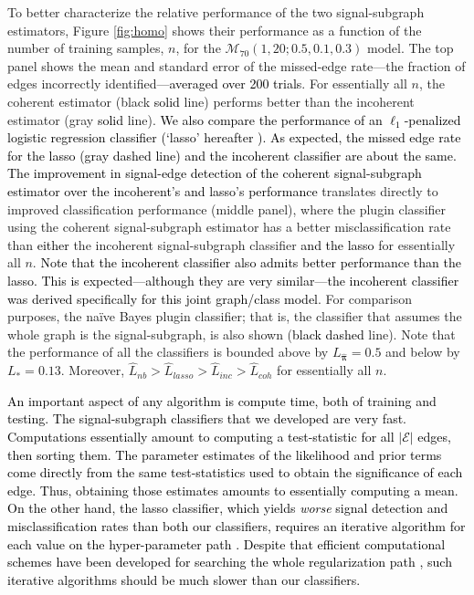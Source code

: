 \documentclass[10pt,journal,cspaper,compsoc]{IEEEtran}
\providecommand{\tk}[1]{\textcolor{black}{#1}}
\providecommand{\mc}[1]{\mathcal{#1}}
\providecommand{\wh}[1]{\widehat{#1}}
\providecommand{\mhb}[1]{\hat{\boldsymbol{#1}}}
\newcommand{\comment}[1]{}
\begin{document}
To better characterize the relative performance of the two signal-subgraph estimators, Figure \ref{fig:homo} shows their performance as a function of the number of training samples, $n$, for the $\mc{M}_{70}(1,20;0.5,0.1,0.3)$ model.  The top panel shows the mean and standard error of the missed-edge rate---the fraction of edges incorrectly identified\tk{---averaged over 200 trials}.  For essentially all $n$, the coherent estimator (black \tk{solid} line) performs better than the incoherent estimator (gray \tk{solid} line).  \tk{We also compare the performance of an $\ell_1$-penalized logistic regression classifier  (`lasso' hereafter \cite{Tibs96}).  As expected, the missed edge rate for the lasso (gray dashed line) and the incoherent classifier are about the same. The improvement in signal-edge detection of the coherent signal-subgraph estimator over the incoherent's and lasso's performance} \comment{This} translates directly to improved classification performance (middle panel), where the plugin classifier using the coherent signal-subgraph estimator has a better misclassification rate than \tk{either} the incoherent signal-subgraph classifier \tk{and the lasso} for essentially all $n$. \tk{Note that the incoherent classifier also admits better performance than the lasso.  This is expected---although they are very similar---the incoherent classifier was derived specifically for this joint graph/class model}.  For comparison purposes, the na\"ive Bayes plugin classifier; that is, the classifier that assumes the whole graph is the signal-subgraph, is also shown (\tk{black dashed} \comment{light gray} line).  Note that the performance of all the classifiers is bounded above by $L_{\mhb{\pi}} = 0.5$ and below by $L_* = 0.13$.  Moreover,  $\wh{L}_{nb} > \wh{L}_{lasso} > \wh{L}_{inc} > \wh{L}_{coh}$ for essentially all $n$.  

\tk{An important aspect of any algorithm is compute time, both of training and testing. The signal-subgraph classifiers that we developed are very fast.  Computations essentially amount to computing a test-statistic for all $|\mc{E}|$ edges, then sorting them.  The parameter estimates of the likelihood and prior terms come directly from the same test-statistics used to obtain the significance of each edge.  Thus, obtaining those estimates amounts to essentially computing a mean.  On the other hand, the lasso classifier, which yields \emph{worse} signal detection and misclassification rates than both our classifiers, requires an iterative algorithm for each value on the hyper-parameter path \cite{Tibs96}.  Despite that efficient computational schemes have been developed for searching the whole regularization path \cite{Efron2004a}, such iterative algorithms should be much slower than our classifiers. }
\end{document}
